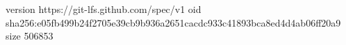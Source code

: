 version https://git-lfs.github.com/spec/v1
oid sha256:e05fb499b24f2705e39cb9b936a2651cacdc933c41893bca8ed4d4ab06ff20a9
size 506853
